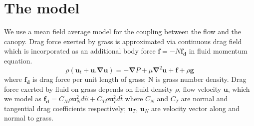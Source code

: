 \documentclass[aps,preprint,floatfix,prl]{revtex4-1}
\newcommand{\bu}{\mathbf{u}}
\newcommand{\grad}{\mathbf{\nabla}}
\newcommand{\del}{\partial}
\begin{document}
\section{The model}
We use a mean field average model for the coupling between the flow and the canopy. Drag force exerted by grass is approximated via continuous drag field 
which is incorporated as an additional body force $\mathbf{f}=-N\mathbf{f_d}$ in fluid momentum equation. 
\begin{equation}
\rho \left(\bu_{t}+\bu.\grad\bu \right) = -\grad P+\mu\grad^{2}\bu +\mathbf{f}+\rho\mathbf{g}
\end{equation}
where $\mathbf{f_{d}}$ is drag force per unit length of grass; N is grass number density. Drag force exerted by fluid on grass depends on
fluid density $\rho$, flow velocity $\bu$, which we model as $\mathbf{f_{d}}=C_N \rho\bu_{N}^{2}d\hat{n}+C_{T}\rho\bu_{T}^{2}d\hat{t}$ where 
$C_{N}$ and $C_{T}$ are normal and tangential drag coefficients respectively; $\bu_{T}$, $\bu_{N}$ are velocity vector along and normal to grass.



  
\end{document}
